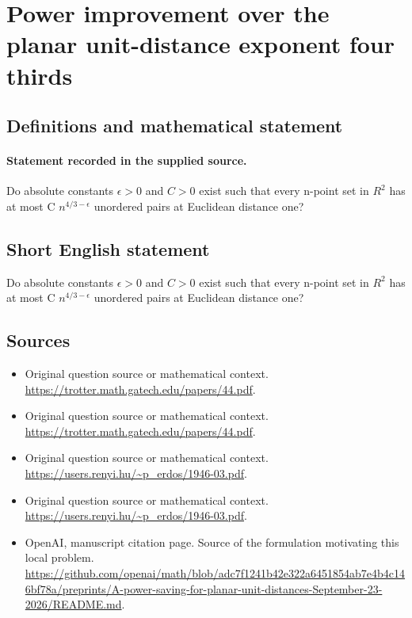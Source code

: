 \documentclass[11pt]{article}
\begin{document}
\section*{Power improvement over the planar unit-distance exponent four thirds}\label{statement}
\subsection{Definitions and mathematical statement}
\paragraph{Statement recorded in the supplied source.}
Do absolute constants $\epsilon >0$ and $C>0$ exist such that every n-point set in $R^2$ has at most C $n^{4/3-\epsilon }$ unordered pairs at Euclidean distance one?
\subsection{Short English statement}
Do absolute constants $\epsilon >0$ and $C>0$ exist such that every n-point set in $R^2$ has at most C $n^{4/3-\epsilon }$ unordered pairs at Euclidean distance one?
\subsection{Sources}
\begin{itemize}
\item[S1] Original question source or mathematical context.
\url{https://trotter.math.gatech.edu/papers/44.pdf}.
\item[S2] Original question source or mathematical context.
\url{https://trotter.math.gatech.edu/papers/44.pdf}.
\item[S3] Original question source or mathematical context.
\url{https://users.renyi.hu/~p_erdos/1946-03.pdf}.
\item[S4] Original question source or mathematical context.
\url{https://users.renyi.hu/~p_erdos/1946-03.pdf}.
\item[S5] OpenAI, manuscript citation page. Source of the formulation motivating this local problem.
\url{https://github.com/openai/math/blob/adc7f1241b42e322a6451854ab7e4b4c146bf78a/preprints/A-power-saving-for-planar-unit-distances-September-23-2026/README.md}.
\end{itemize}
\end{document}
